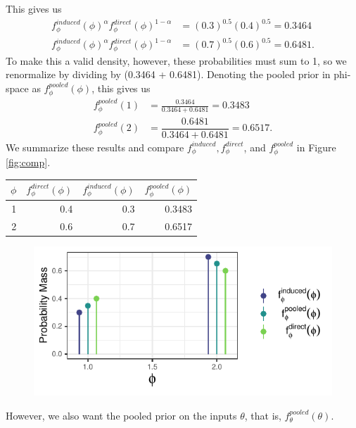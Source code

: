 \documentclass[12pt,twoside]{smiththesis}
\begin{document}
This gives us
\begin{align*}
f_\phi^{induced}(\phi)^{\alpha} f_\phi^{direct}(\phi)^{1-\alpha} &= (0.3)^{0.5}(0.4)^{0.5} = 0.3464\\
f_\phi^{induced}(\phi)^{\alpha} f_\phi^{direct}(\phi)^{1-\alpha} &= (0.7)^{0.5}(0.6)^{0.5} = 0.6481.
\end{align*}
To make this a valid density, however, these probabilities must sum to 1, so we renormalize by dividing by (0.3464 + 0.6481). Denoting the pooled prior in phi-space as \(f_\phi^{pooled}(\phi)\), this gives us
\begin{align*}
f_\phi^{pooled}(1) &= \frac{ 0.3464  }  { 0.3464 + 0.6481 } = 0.3483 \\
f_\phi^{pooled}(2) &= \dfrac{ 0.6481 } { 0.3464 + 0.6481}  =0.6517.
\end{align*}
We summarize these results and compare \(f_\phi^{induced}, f_\phi^{direct}\), and \(f_\phi^{pooled}\) in Figure \ref{fig:comp}.
\begin{multicols}{2}
\begin{table}[H]
\centering
\begin{tabular}[t]{r|r|r|r}
\hline
$\phi$ & $f_\phi^{direct}(\phi)$ & $f_\phi^{induced}(\phi)$ & $f_\phi^{pooled}(\phi)$\\
\hline
1 & 0.4 & 0.3 & 0.3483\\
\hline
2 & 0.6 & 0.7 & 0.6517\\
\hline
\end{tabular}
\end{table}
\columnbreak
\begin{figure}

{\centering \includegraphics[width=1\linewidth]{thesis_files/figure-latex/unnamed-chunk-15-1} 

}

\caption{\label{fig:comp}}\label{fig:unnamed-chunk-15}
\end{figure}
\end{multicols}
However, we also want the pooled prior on the inputs \(\theta\), that is, \(f_\theta^{pooled}(\theta)\).
\end{document}
